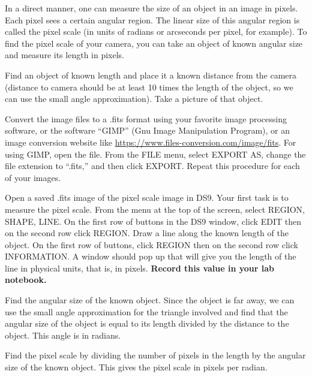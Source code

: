 In a direct manner, one can measure the size of an object in an image in pixels. Each pixel sees a certain angular region. The linear size of this angular region is called the pixel scale (in units of radians or arcseconds per pixel, for example). To find the pixel scale of your camera, you can take an object of known angular size and measure its length in pixels.
\begin{steps}
	\item Find an object of known length and place it a known distance from the camera (distance to camera should be at least 10 times the length of the object, so we can use the small angle approximation). Take a picture of that object.

	\item Convert the image files to a .fits format using your favorite image processing software, or the software ``GIMP'' (Gnu Image Manipulation Program), or an image conversion website like \url{https://www.files-conversion.com/image/fits}. For using GIMP, open the file. From the FILE menu, select EXPORT AS, change the
	file extension to “.fits,” and then click EXPORT. Repeat this procedure for each of your
	images.
	
	\item Open a saved .fits image of the pixel scale image in DS9. Your first task is to measure the pixel scale.
	From the menu at the top of the screen, select REGION, SHAPE, LINE. On the first row
	of buttons in the DS9 window, click EDIT then on the second row click REGION. Draw
	a line along the known length of the object. On the first row of buttons, click REGION then on the
	second row click INFORMATION. A window should pop up that will give you the length
	of the line in physical units, that is, in pixels. \textbf{Record this value in your lab notebook.}
	
	\item Find the angular size of the known object. Since the object is far away, we can use the small angle approximation for the triangle involved and find that the angular size of the object is equal to its length divided by the distance to the object. This angle is in radians.
	
	\item Find the pixel scale by dividing the number of pixels in the length by the angular size of the known object. This gives the pixel scale in pixels per radian.
	
\end{steps}

